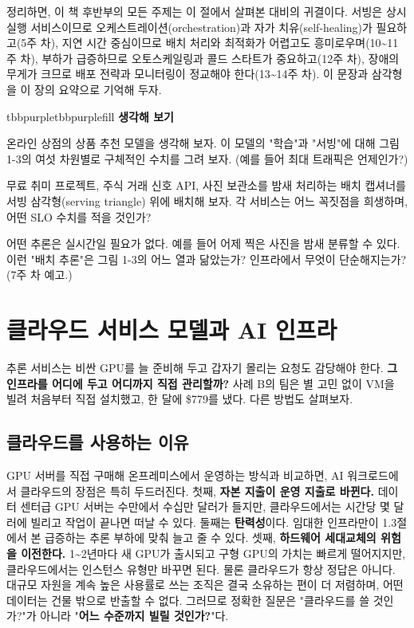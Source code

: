 정리하면, 이 책 후반부의 모든 주제는 이 절에서 살펴본 대비의 귀결이다. 서빙은 상시 실행 서비스이므로 오케스트레이션(orchestration)과 자가 치유(self-healing)가 필요하고(5주 차), 지연 시간 중심이므로 배치 처리와 최적화가 어렵고도 흥미로우며(10\textasciitilde{}11주 차), 부하가 급증하므로 오토스케일링과 콜드 스타트가 중요하고(12주 차), 장애의 무게가 크므로 배포 전략과 모니터링이 정교해야 한다(13\textasciitilde{}14주 차). 이 문장과 삼각형을 이 장의 요약으로 기억해 두자.

\begin{calloutbox}{tbbpurple}{tbbpurplefill}
{\normalsize\bfseries\color{tbbpurple}생각해 보기}\par\vspace{3pt}
\begin{tbbitemize}
  \item 온라인 상점의 상품 추천 모델을 생각해 보자. 이 모델의 "학습"과 "서빙"에 대해 그림 1-3의 여섯 차원별로 구체적인 수치를 그려 보자. (예를 들어 최대 트래픽은 언제인가?)
  \item 무료 취미 프로젝트, 주식 거래 신호 API, 사진 보관소를 밤새 처리하는 배치 캡셔너를 서빙 삼각형(serving triangle) 위에 배치해 보자. 각 서비스는 어느 꼭짓점을 희생하며, 어떤 SLO 수치를 적을 것인가?
  \item 어떤 추론은 실시간일 필요가 없다. 예를 들어 어제 찍은 사진을 밤새 분류할 수 있다. 이런 "배치 추론"은 그림 1-3의 어느 열과 닮았는가? 인프라에서 무엇이 단순해지는가? (7주 차 예고.)
\end{tbbitemize}
\end{calloutbox}

\section{클라우드 서비스 모델과 AI 인프라}

추론 서비스는 비싼 GPU를 늘 준비해 두고 갑자기 몰리는 요청도 감당해야 한다. \textbf{그 인프라를 어디에 두고 어디까지 직접 관리할까?} 사례 B의 팀은 별 고민 없이 VM을 빌려 처음부터 직접 설치했고, 한 달에 \$779를 냈다. 다른 방법도 살펴보자.

\subsection*{클라우드를 사용하는 이유}

GPU 서버를 직접 구매해 온프레미스에서 운영하는 방식과 비교하면, AI 워크로드에서 클라우드의 장점은 특히 두드러진다. 첫째, \textbf{자본 지출이 운영 지출로 바뀐다.} 데이터 센터급 GPU 서버는 수만에서 수십만 달러가 들지만, 클라우드에서는 시간당 몇 달러에 빌리고 작업이 끝나면 떠날 수 있다. 둘째는 \textbf{탄력성}이다. 임대한 인프라만이 1.3절에서 본 급증하는 추론 부하에 맞춰 늘고 줄 수 있다. 셋째, \textbf{하드웨어 세대교체의 위험을 이전한다.} 1\textasciitilde{}2년마다 새 GPU가 출시되고 구형 GPU의 가치는 빠르게 떨어지지만, 클라우드에서는 인스턴스 유형만 바꾸면 된다. 물론 클라우드가 항상 정답은 아니다. 대규모 자원을 계속 높은 사용률로 쓰는 조직은 결국 소유하는 편이 더 저렴하며, 어떤 데이터는 건물 밖으로 반출할 수 없다. 그러므로 정확한 질문은 "클라우드를 쓸 것인가?"가 아니라 "\textbf{어느 수준까지 빌릴 것인가?}"다.

